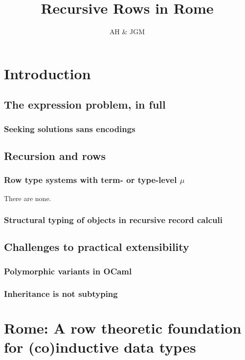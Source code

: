 \documentclass[authoryear,acmsmall,screen]{acmart}
\title{Recursive Rows in Rome}
\author{AH \& JGM}
\begin{document}
\maketitle
\section{Introduction}
\subsection{The expression problem, in full}

\subsubsection{Seeking solutions sans encodings}

\subsection{Recursion and rows}

\subsubsection{Row type systems with term- or type-level $\mu$} There are none.
\subsubsection{Structural typing of objects in recursive record calculi}

\subsection{Challenges to practical extensibility}

\subsubsection{Polymorphic variants in OCaml}

\subsubsection{Inheritance is not subtyping}

\section{Rome: A row theoretic foundation for (co)inductive data types}
\end{document}
